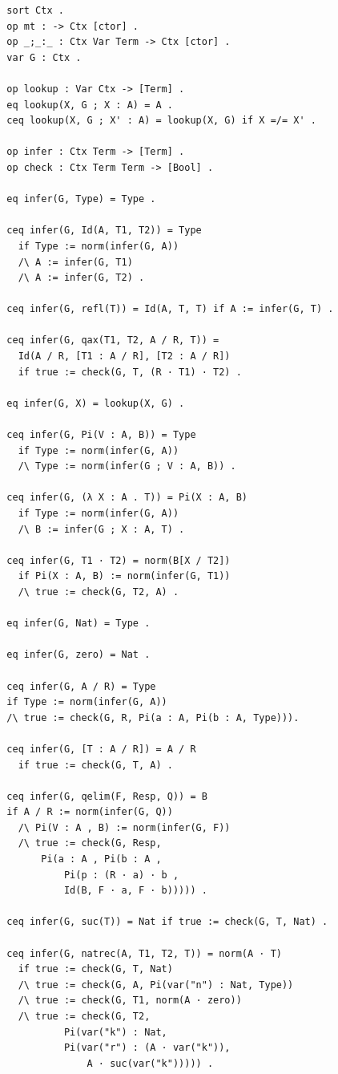 \begin{lstlisting}
  sort Ctx .
  op mt : -> Ctx [ctor] .
  op _;_:_ : Ctx Var Term -> Ctx [ctor] .
  var G : Ctx .

  op lookup : Var Ctx -> [Term] .
  eq lookup(X, G ; X : A) = A .
  ceq lookup(X, G ; X' : A) = lookup(X, G) if X =/= X' .

  op infer : Ctx Term -> [Term] .
  op check : Ctx Term Term -> [Bool] .

  eq infer(G, Type) = Type .

  ceq infer(G, Id(A, T1, T2)) = Type
    if Type := norm(infer(G, A))
    /\ A := infer(G, T1)
    /\ A := infer(G, T2) .

  ceq infer(G, refl(T)) = Id(A, T, T) if A := infer(G, T) .

  ceq infer(G, qax(T1, T2, A / R, T)) =
    Id(A / R, [T1 : A / R], [T2 : A / R])
    if true := check(G, T, (R · T1) · T2) .

  eq infer(G, X) = lookup(X, G) .

  ceq infer(G, Pi(V : A, B)) = Type
    if Type := norm(infer(G, A))
    /\ Type := norm(infer(G ; V : A, B)) .

  ceq infer(G, (λ X : A . T)) = Pi(X : A, B)
    if Type := norm(infer(G, A))
    /\ B := infer(G ; X : A, T) .

  ceq infer(G, T1 · T2) = norm(B[X / T2])
    if Pi(X : A, B) := norm(infer(G, T1))
    /\ true := check(G, T2, A) .

  eq infer(G, Nat) = Type .

  eq infer(G, zero) = Nat .

  ceq infer(G, A / R) = Type
  if Type := norm(infer(G, A))
  /\ true := check(G, R, Pi(a : A, Pi(b : A, Type))).

  ceq infer(G, [T : A / R]) = A / R
    if true := check(G, T, A) .

  ceq infer(G, qelim(F, Resp, Q)) = B
  if A / R := norm(infer(G, Q))
    /\ Pi(V : A , B) := norm(infer(G, F))
    /\ true := check(G, Resp,
        Pi(a : A , Pi(b : A ,
            Pi(p : (R · a) · b ,
            Id(B, F · a, F · b))))) .

  ceq infer(G, suc(T)) = Nat if true := check(G, T, Nat) .

  ceq infer(G, natrec(A, T1, T2, T)) = norm(A · T)
    if true := check(G, T, Nat)
    /\ true := check(G, A, Pi(var("n") : Nat, Type))
    /\ true := check(G, T1, norm(A · zero))
    /\ true := check(G, T2,
            Pi(var("k") : Nat,
            Pi(var("r") : (A · var("k")),
                A · suc(var("k"))))) .


\end{lstlisting}
